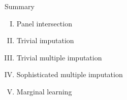 \documentclass[mathserif]{beamer}
\begin{document}
\begin{frame}{Summary}
\begin{enumerate}[(I)]
  \item {\color{colneg}Panel intersection}
  \vspace{0.7em}
  \item {\color{colneg}Trivial imputation}
  \vspace{0.7em}
  \item {\color{colneg}Trivial multiple imputation}
  \vspace{0.7em}
  \item {\color{colpos}Sophisticated multiple imputation}
  \vspace{0.7em}
  \item {\color{colpos}Marginal learning}
\end{enumerate}
\end{frame}
\end{document}
